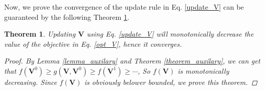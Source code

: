 \documentclass[10pt,journal,compsoc]{IEEEtran}
\newtheorem{theorem}[subsubsection]{Theorem}
\begin{document}
Now, we prove the convergence of the update rule in Eq. \eqref{update_V} can be guaranteed by the following Theorem \ref{theorem_U_convergence}.
\begin{theorem}\label{theorem_U_convergence}
Updating $\mathbf{V}$ using Eq. \eqref{update_V} will monotonically decrease the value of the objective in Eq. \eqref{opt_V}, hence it converges.
\begin{proof}
By Lemma \ref{lemma_auxilary} and Theorem \ref{theorem_auxilary}, we can get that $\mathit{f}(\mathbf{V}^0) \geq \mathit{g}(\mathbf{V}, \mathbf{V}^0) \geq \mathit{f}(\mathbf{V}^1) \geq \cdots$, So $\mathit{f}(\mathbf{V})$ is monotonically decreasing. Since $\mathit{f}(\mathbf{V})$ is obviously belower bounded, we prove this theorem.
\end{proof}
\end{theorem}
\end{document}
